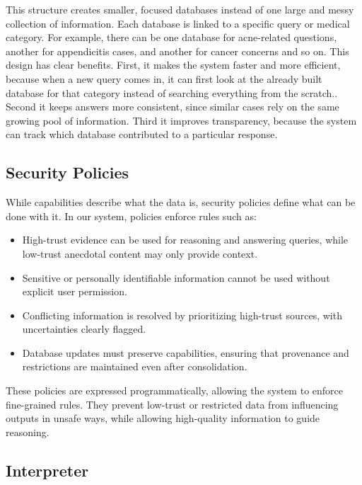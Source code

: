 \documentclass[conference, anonymous]{IEEEtran}
\begin{document}
This structure creates smaller, focused databases instead of one large and messy collection of information. Each database is linked to a specific query or medical category. For example, there can be one database for acne-related questions, another for appendicitis cases, and another for cancer concerns and so on.  This design has clear benefits. First, it makes the system faster and more efficient, because when a new query comes in, it can first look at the already built database for that category instead of searching everything from the scratch.. Second it keeps answers more consistent, since similar cases rely on the same growing pool of information. Third it improves transparency, because the system can track which database contributed to a particular response.

\subsection{Security Policies}
\label{subsec: security-policies}

While capabilities describe what the data is, security policies define what can be done with it. In our system, policies enforce rules such as:
\begin{itemize}
    \item High-trust evidence can be used for reasoning and answering queries, while low-trust anecdotal content may only provide context.
    \item Sensitive or personally identifiable information cannot be used without explicit user permission. 
    \item Conflicting information is resolved by prioritizing high-trust sources, with uncertainties clearly flagged.
    \item Database updates must preserve capabilities, ensuring that provenance and restrictions are maintained even after consolidation.
\end{itemize}

These policies are expressed programmatically, allowing the system to enforce fine-grained rules. They prevent low-trust or restricted data from influencing outputs in unsafe ways, while allowing high-quality information to guide reasoning.

\subsection{Interpreter}
\label{subsec: interpreter}
\end{document}
